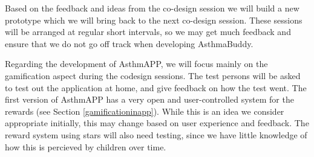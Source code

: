 Based on the feedback and ideas from the co-design session we will build a new prototype which we will bring back to the next co-design session. These sessions will be arranged at regular short intervals, so we may get much feedback and ensure that we do not go off track when developing AsthmaBuddy.

Regarding the development of AsthmAPP, we will focus mainly on the gamification aspect during the codesign sessions. The test persons will be asked to test out the application at home, and give feedback on how the test went. The first version of AsthmAPP has a very open and user-controlled system for the rewards (see Section \ref{gamificationinapp}). While this is an idea we consider appropriate initially, this may change based on user experience and feedback. The reward system using stars will also need testing, since we have little knowledge of how this is percieved by children over time.
